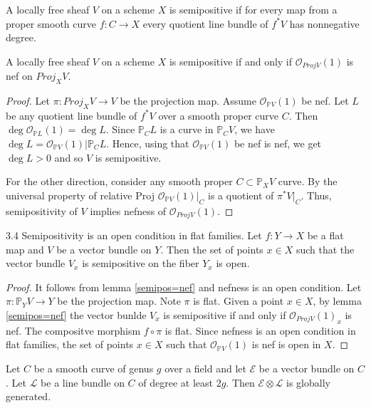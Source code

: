 \begin{definition}
A locally free sheaf $V$ on a scheme $X$ is semipositive if for every map from a proper smooth curve $f:C\to X$ every quotient line bundle of $f^*V$ has nonnegative degree.
\end{definition}

\begin{lemma}\label{semipos=nef}
A locally free sheaf $V$ on a scheme $X$ is semipositive if and only if $\mathcal{O}_{Proj V}(1)$ is nef on $Proj_XV$.
\end{lemma}
\begin{proof}
Let $\pi: Proj_X V\to V$ be the projection map. Assume $\mathcal{O}_{\mathbb{P}V}(1)$ be nef. Let $L$ be  any quotient line bundle of $f^*V$ over a smooth proper curve $C$. Then $\deg \mathcal{O}_{\mathbb{P}L}(1)=\deg L$. Since $\mathbb{P}_CL$ is a curve in $\mathbb{P}_CV$, we have $\deg L=\mathcal{O}_{\mathbb{P}V}(1)|\mathbb{P}_CL$. Hence, using that $\mathcal{O}_{\mathbb{P}V}(1)$ be nef is nef, we get $\deg L>0$ and so $V$ is semipositive.

For the other direction, consider any smooth proper $C\subset \mathbb{P}_XV$ curve. By the universal property of relative Proj $\mathcal{O}_{\mathbb{P}V}(1)|_C$ is a quotient of $\pi^*V|_C$. Thus, semipositivity of $V$ implies nefness of $\mathcal{O}_{Proj V}(1)$.
\end{proof}

\begin{lemma}
3.4 Semipositivity is an open condition in flat families.
Let $f:Y\to X$ be a flat map and $V$ be a vector bundle on $Y$. Then the set of points $x\in X$ such that the vector bundle $V_x$ is semipositive on the fiber $Y_x$ is open.
\end{lemma}

\begin{proof}
It follows from lemma \ref{semipos=nef} and nefness is an open condition.
Let $\pi:\mathbb{P}_YV\to Y$ be the projection map.  Note $\pi$ is flat. Given a point $x\in X$, by lemma \ref{semipos=nef} the vector bunlde $V_x$ is semipositive if and only if $\mathcal{O}_{Proj V}(1)_x$ is nef. The compositve morphism $f\circ \pi$ is flat. Since nefness is an open condition in flat families, the set of points $x\in X$ such that $\mathcal{O}_{\mathbb{P}V}(1)$ is nef is open in $X$.
\end{proof}

\begin{lemma}\label{global_generation_of_specific_twist_on_curve}
Let $C$ be a smooth curve of genus $g$ over a field and let $\mathcal{E}$ be a vector bundle on $C$. Let $\mathcal{L}$ be a line bundle on $C$ of degree at least $2g$. Then $\mathcal{E}\otimes\mathcal{L}$ is globally generated.
\end{lemma}

